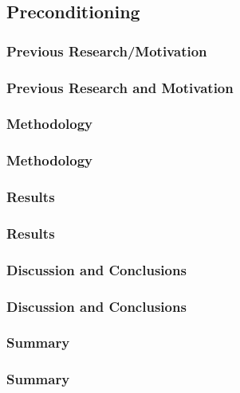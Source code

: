 \subsection[Preconditioning]{Preconditioning}
\subsubsection[Motivation]{Previous Research/Motivation}
\begin{frame}
\frametitle{Previous Research and Motivation}

\end{frame}

\subsubsection[Methodology]{Methodology}
\begin{frame}
\frametitle{Methodology}

\end{frame}

\subsubsection[Results]{Results}
\begin{frame}
\frametitle{Results}

\end{frame}

\subsubsection[Discussion \& Conclusions]{Discussion and Conclusions}
\begin{frame}
\frametitle{Discussion and Conclusions}

\end{frame}

\subsubsection[Summary]{Summary}
\begin{frame}
\frametitle{Summary}

\end{frame}